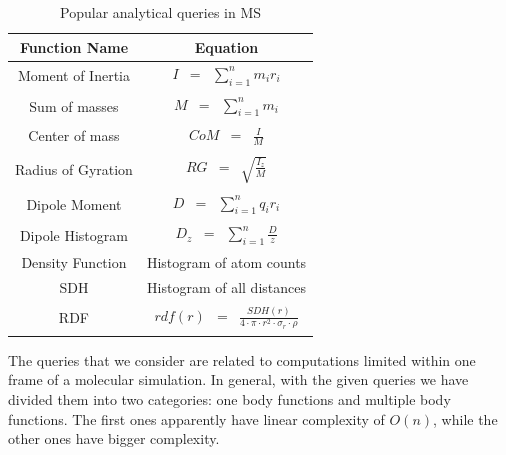 \documentclass[12pt,letterpaper]{report}
\begin{document}
\begin{table}[h]
\centering
\resizebox{\columnwidth}{!}
{
\begin{minipage}{\columnwidth}
\centering
\renewcommand*{\arraystretch}{1.5}
\tabcolsep=0.12cm
\begin{tabular}{|c| c|}
\hline %
Function Name & Equation\\[0.5ex] 
\hline
Moment of Inertia & $\begin{array} {lcl} I & = & \sum\limits_{i=1}^n m_ir_i \end{array}$ \\[0.5ex]
\hline
Sum of masses & $\begin{array} {lcl} M & = & \sum\limits_{i=1}^n m_i \end{array}$ \\[0.5ex]
\hline
Center of mass & $\begin{array} {lcl} CoM & = & \frac{I}{M} \end{array}$ \\[0.5ex]
\hline
Radius of Gyration & $\begin{array} {lcl} RG & = & \sqrt{\frac{I_z}{M}} \end{array}$ \\[0.5ex]
\hline
Dipole Moment& $\begin{array} {lcl} D & = & \sum\limits_{i=1}^n q_ir_i \end{array}$ \\[0.5ex]
\hline
Dipole Histogram & $\begin{array} {lcl} D_z & = & \sum\limits_{i=1}^n \frac{D}{z} \end{array}$ \\[0.5ex]
\hline
Density Function & Histogram of atom counts \\[0.5ex]
\hline
SDH & Histogram of all distances \\[0.5ex]
\hline
RDF & $\begin{array} {lcl} rdf(r) & = & \frac{SDH(r)}{4 \cdot \pi \cdot r^2 \cdot \sigma_r \cdot \rho} \end{array}$ \\[0.5ex]
\hline
\end{tabular}
\caption[Some of the popular analytical queries in MS]{Popular analytical queries in MS }
\label{tb:queries}

\end{minipage}

}
\end{table}

\noindent\hspace{3em}The queries that we consider are related to computations limited within one frame of a molecular simulation. In general, with the given queries we have divided them into two categories: one body functions and multiple body functions. The first ones apparently have linear complexity of $O(n)$, while the other ones have bigger complexity. 
\end{document}
